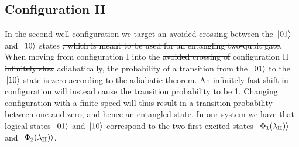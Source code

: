 \documentclass[twocolumn,superscriptaddress,unsortedaddress,
 amsmath,amssymb,
 aps,
]{revtex4-2}
\begin{document}
    \subsection{Configuration II}
        In the second well configuration we target an avoided crossing between the $\ket*{01}$ and
        $\ket*{10}$ states \st{, which is meant to be used for an entangling two-qubit gate}. When moving from configuration I into the \st{avoided crossing of} configuration II \st{infinitely slow} adiabatically, the probability of a transition from the $\ket*{01}$ to the $\ket*{10}$ state is zero according to the adiabatic theorem. An infinitely fast shift in configuration will instead cause the transition probability to be 1. Changing configuration with a finite speed will thus result in a transition probability between one and zero, and hence an entangled state. %
        In our system we have that logical states $\ket*{01}$ and $\ket*{10}$ correspond
        to the two first excited states $\ket*{\Phi_1(\lambda_\mathrm{II})}$ and
        $\ket*{\Phi_2(\lambda_\mathrm{II})}$.
        
\end{document}
